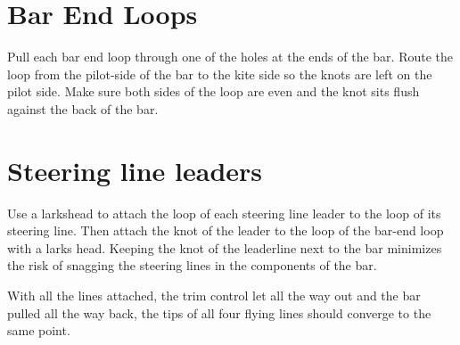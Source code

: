 \documentclass[]{book}
\begin{document}
\hypertarget{bar-end-loops-1}{%
\section{Bar End Loops}\label{bar-end-loops-1}}

Pull each bar end loop through one of the holes at the ends of the bar. Route the loop from the pilot-side of the bar to the kite side so the knots are left on the pilot side. Make sure both sides of the loop are even and the knot sits flush against the back of the bar.

\hypertarget{steering-line-leaders}{%
\section{Steering line leaders}\label{steering-line-leaders}}

Use a larkshead to attach the loop of each steering line leader to the loop of its steering line. Then attach the knot of the leader to the loop of the bar-end loop with a larks head. Keeping the knot of the leaderline next to the bar minimizes the risk of snagging the steering lines in the components of the bar.

With all the lines attached, the trim control let all the way out and the bar pulled all the way back, the tips of all four flying lines should converge to the same point.


\end{document}
